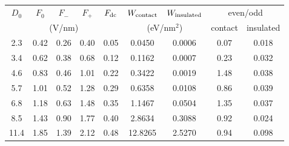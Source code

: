 \begin{tabular}{ccccccccc}
\hline\hline
$D_0$ & $F_0$ & $F_-$ & $F_+$ & $F_{\rm dc}$ & $W_{\rm contact}$ & $W_{\rm insulated}$ & \multicolumn{2}{c}{even/odd} \\
\multicolumn{5}{c}{(V/nm)} & \multicolumn{2}{c}{(eV/nm$^2$)} & contact & insulated \\
\hline
2.3 & 0.42 & 0.26 & 0.40 & 0.05 & 0.0450 & 0.0006 & 0.07 & 0.018 \\
3.4 & 0.62 & 0.38 & 0.68 & 0.12 & 0.1162 & 0.0007 & 0.23 & 0.032 \\
4.6 & 0.83 & 0.46 & 1.01 & 0.22 & 0.3422 & 0.0019 & 1.48 & 0.038 \\
5.7 & 1.01 & 0.52 & 1.28 & 0.29 & 0.6358 & 0.0108 & 0.86 & 0.039 \\
6.8 & 1.18 & 0.63 & 1.48 & 0.35 & 1.1467 & 0.0504 & 1.35 & 0.037 \\
8.5 & 1.43 & 0.90 & 1.77 & 0.40 & 2.8634 & 0.3088 & 0.92 & 0.024 \\
11.4 & 1.85 & 1.39 & 2.12 & 0.48 & 12.8265 & 2.5270 & 0.94 & 0.098 \\
\hline\hline
\end{tabular}
